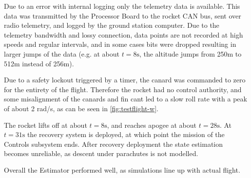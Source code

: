 Due to an error with internal logging only the telemetry data is available. This data was transmitted by the Processor Board to the rocket CAN bus, sent over radio telemetry, and logged by the ground station computer.
Due to the telemetry bandwidth and lossy connection, data points are not recorded at high speeds and regular intervals, and in some cases bits were dropped resulting in larger jumps of the data (e.g. at about $t=8\mathrm{s}$, the altitude jumps from 250m to 512m instead of 256m).   

Due to a safety lockout triggered by a timer, the canard was commanded to zero for the entirety of the flight.
Therefore the rocket had no control authority, and some misalignment of the canards and fin cant led to a slow roll rate with a peak of about 2 rad/s, as can be seen in \autoref{fig:testflight-w}.

The rocket lifts off at about $t=8\mathrm{s}$, and reaches apogee at about $t=28\mathrm{s}$.
At $t=31\mathrm{s}$ the recovery system is deployed, at which point the mission of the Controls subsystem ends. 
After recovery deployment the state estimation becomes unreliable, as descent under parachutes is not modelled.

Overall the Estimator performed well, as simulations line up with actual flight. 

